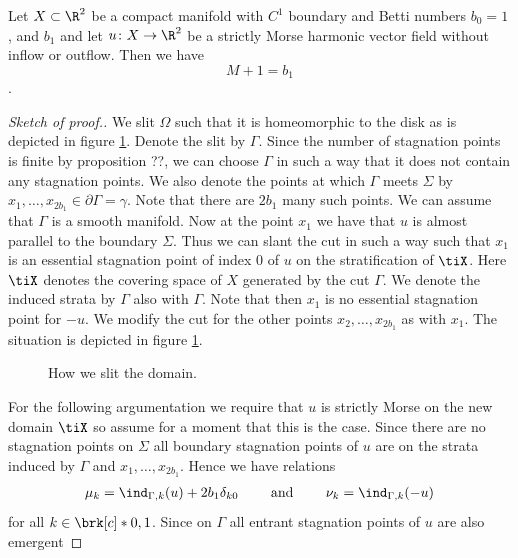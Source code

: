 \begin{proposition}\label{pr:n2_hvf_noInflowNoOutflow}
  Let $X\subset\R^2$ be a compact manifold with $C^1$ boundary and Betti numbers $b_0=1$, and $b_1$
  and let $u\colon X\to\R^2$ be 
  a strictly Morse harmonic vector field without inflow or outflow.
  Then we have $$M+1=b_1$$.
\end{proposition}
\begin{proof}[Sketch of proof.]
  We slit $\Omega$ such that it is homeomorphic to the disk as is 
  depicted in figure \ref{fi:n2_hvf_slitDomain}.
  Denote the slit by $\Gamma$. Since the number of stagnation points is 
  finite by proposition ??, we can choose $\Gamma$ in such a way that it does not contain
  any stagnation points.
  We also denote the points at which
  $\Gamma$ meets $\Sigma$ by $x_1,\dots,x_{2b_1}\in\partial\Gamma=\gamma$.
  Note that there are $2b_1$ many such points.
  We can assume that $\Gamma$ is a smooth manifold. Now at the point $x_1$
  we have that $u$ is almost parallel to the boundary $\Sigma$. Thus we can slant
  the cut in such a way such that $x_1$ is an essential stagnation point of index $0$ of $u$ on the stratification
  of $\tiX$. Here $\tiX$ denotes the covering space of $X$ generated by the cut $\Gamma$.
  We denote the induced strata by $\Gamma$ also with $\Gamma$. Note that then $x_1$ is no
  essential stagnation point for $-u$.
  We modify the cut for the other points $x_2,\dots,x_{2b_1}$ as with $x_1$.
  The situation is depicted in figure \ref{fi:n2_hvf_slitDomain}.
  \begin{figure}
    \centering
    
    \caption{How we slit the domain.}
    \label{fi:n2_hvf_slitDomain}
  \end{figure}
  For the following argumentation we require that $u$ is strictly Morse on the new domain $\tiX$ 
  so assume for a moment that this is the case.
  Since there are no stagnation points on $\Sigma$ all boundary stagnation points of $u$ are on
  the strata induced by $\Gamma$ and $x_1,\dots,x_{2b_1}$. Hence we have relations
  \begin{align}
    \mu_k=\ind_{\Gamma,k}(u)+2b_1\delta_{k0} \qquad\text{ and }\qquad
    \nu_k=\ind_{\Gamma,k}(-u)\label{eq:n2_hvf_noInflowNoOutflow_relationsMuIndex}
  \end{align}
  for all $k\in\brk[c]*{0,1}$.
  Since on $\Gamma$ all entrant stagnation points of $u$ are also emergent

\end{proof}
